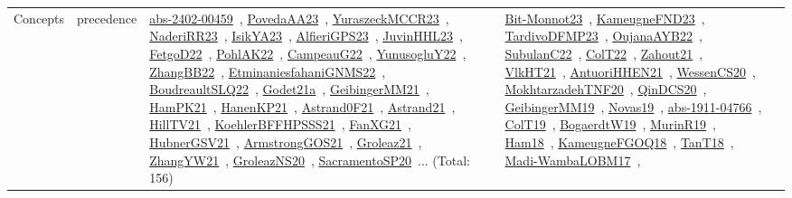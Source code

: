 {\begin{longtable}{lp{3cm}>{\raggedright\arraybackslash}p{6cm}>{\raggedright\arraybackslash}p{6cm}>{\raggedright\arraybackslash}p{8cm}}
Concepts & precedence & \href{works/abs-2402-00459.pdf}{abs-2402-00459}~\cite{abs-2402-00459}, \href{works/PovedaAA23.pdf}{PovedaAA23}~\cite{PovedaAA23}, \href{works/YuraszeckMCCR23.pdf}{YuraszeckMCCR23}~\cite{YuraszeckMCCR23}, \href{works/NaderiRR23.pdf}{NaderiRR23}~\cite{NaderiRR23}, \href{works/IsikYA23.pdf}{IsikYA23}~\cite{IsikYA23}, \href{works/AlfieriGPS23.pdf}{AlfieriGPS23}~\cite{AlfieriGPS23}, \href{works/JuvinHHL23.pdf}{JuvinHHL23}~\cite{JuvinHHL23}, \href{works/FetgoD22.pdf}{FetgoD22}~\cite{FetgoD22}, \href{works/PohlAK22.pdf}{PohlAK22}~\cite{PohlAK22}, \href{works/CampeauG22.pdf}{CampeauG22}~\cite{CampeauG22}, \href{works/YunusogluY22.pdf}{YunusogluY22}~\cite{YunusogluY22}, \href{works/ZhangBB22.pdf}{ZhangBB22}~\cite{ZhangBB22}, \href{works/EtminaniesfahaniGNMS22.pdf}{EtminaniesfahaniGNMS22}~\cite{EtminaniesfahaniGNMS22}, \href{works/BoudreaultSLQ22.pdf}{BoudreaultSLQ22}~\cite{BoudreaultSLQ22}, \href{works/Godet21a.pdf}{Godet21a}~\cite{Godet21a}, \href{works/GeibingerMM21.pdf}{GeibingerMM21}~\cite{GeibingerMM21}, \href{works/HamPK21.pdf}{HamPK21}~\cite{HamPK21}, \href{works/HanenKP21.pdf}{HanenKP21}~\cite{HanenKP21}, \href{works/Astrand0F21.pdf}{Astrand0F21}~\cite{Astrand0F21}, \href{works/Astrand21.pdf}{Astrand21}~\cite{Astrand21}, \href{works/HillTV21.pdf}{HillTV21}~\cite{HillTV21}, \href{works/KoehlerBFFHPSSS21.pdf}{KoehlerBFFHPSSS21}~\cite{KoehlerBFFHPSSS21}, \href{works/FanXG21.pdf}{FanXG21}~\cite{FanXG21}, \href{works/HubnerGSV21.pdf}{HubnerGSV21}~\cite{HubnerGSV21}, \href{works/ArmstrongGOS21.pdf}{ArmstrongGOS21}~\cite{ArmstrongGOS21}, \href{works/Groleaz21.pdf}{Groleaz21}~\cite{Groleaz21}, \href{works/ZhangYW21.pdf}{ZhangYW21}~\cite{ZhangYW21}, \href{works/GroleazNS20.pdf}{GroleazNS20}~\cite{GroleazNS20}, \href{works/SacramentoSP20.pdf}{SacramentoSP20}~\cite{SacramentoSP20}... (Total: 156) & \href{works/Bit-Monnot23.pdf}{Bit-Monnot23}~\cite{Bit-Monnot23}, \href{works/KameugneFND23.pdf}{KameugneFND23}~\cite{KameugneFND23}, \href{works/TardivoDFMP23.pdf}{TardivoDFMP23}~\cite{TardivoDFMP23}, \href{works/OujanaAYB22.pdf}{OujanaAYB22}~\cite{OujanaAYB22}, \href{works/SubulanC22.pdf}{SubulanC22}~\cite{SubulanC22}, \href{works/ColT22.pdf}{ColT22}~\cite{ColT22}, \href{works/Zahout21.pdf}{Zahout21}~\cite{Zahout21}, \href{works/VlkHT21.pdf}{VlkHT21}~\cite{VlkHT21}, \href{works/AntuoriHHEN21.pdf}{AntuoriHHEN21}~\cite{AntuoriHHEN21}, \href{works/WessenCS20.pdf}{WessenCS20}~\cite{WessenCS20}, \href{works/MokhtarzadehTNF20.pdf}{MokhtarzadehTNF20}~\cite{MokhtarzadehTNF20}, \href{works/QinDCS20.pdf}{QinDCS20}~\cite{QinDCS20}, \href{works/GeibingerMM19.pdf}{GeibingerMM19}~\cite{GeibingerMM19}, \href{works/Novas19.pdf}{Novas19}~\cite{Novas19}, \href{works/abs-1911-04766.pdf}{abs-1911-04766}~\cite{abs-1911-04766}, \href{works/ColT19.pdf}{ColT19}~\cite{ColT19}, \href{works/BogaerdtW19.pdf}{BogaerdtW19}~\cite{BogaerdtW19}, \href{works/MurinR19.pdf}{MurinR19}~\cite{MurinR19}, \href{works/Ham18.pdf}{Ham18}~\cite{Ham18}, \href{works/KameugneFGOQ18.pdf}{KameugneFGOQ18}~\cite{KameugneFGOQ18}, \href{works/TanT18.pdf}{TanT18}~\cite{TanT18}, \href{works/Madi-WambaLOBM17.pdf}{Madi-WambaLOBM17}~\cite{Madi-WambaLOBM17}, 
\end{longtable}}
